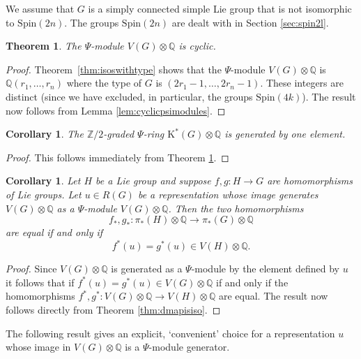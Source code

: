 \documentclass[twoside,a4paper,reqno,11pt]{amsart}
\newtheorem{theorem}[lemma]{Theorem}
\newtheorem{corollary}[lemma]{Corollary}
\newcommand{\K}{\mathrm{K}}
\newcommand{\Q}{\mathbb{Q}}
\newcommand{\Z}{\mathbb{Z}}
\renewcommand{\o}{\otimes}
\newcommand{\Spin}{\mathrm{Spin}}
\begin{document}
We assume that $G$ is a simply connected simple Lie group that is not isomorphic to $\Spin(2n)$. The groups $\Spin(2n)$ are dealt with in Section \ref{sec:spin2l}. 

\begin{theorem} \label{thm:simplesinglegenpsimod}
The $\Psi$-module $V(G)\o\Q$ is cyclic.
\end{theorem}

\begin{proof}
Theorem~\ref{thm:isoswithtype} shows that the $\Psi$-module $V(G) \o \Q$ is $\Q(r_1, \dots, r_n)$ where the type of $G$ is $(2r_1-1, \dots, 2r_n-1)$. These integers are distinct (since we have excluded, in particular, the groups $\Spin(4k)$). The result now follows from Lemma \ref{lem:cyclicpsimodules}. 
\end{proof}


\begin{corollary} \label{cor:Z2psi}
The $\Z/2$-graded $\Psi$-ring $\K^*(G) \o\Q$ is generated by one element.
\end{corollary}

\begin{proof}
This follows immediately from Theorem \ref{thm:simplesinglegenpsimod}.
\end{proof}

\begin{corollary} \label{cor:V(H)}
Let $H$ be a Lie group and suppose $f, g : H \to G$ are homomorphisms of Lie groups.  Let $u \in R(G)$ be a representation whose image generates $V(G)\o \Q$ as a $\Psi$-module $V(G)\o\Q$. Then the two homomorphisms
$$
f_*, g_* : \pi_*(H)\o \Q \to \pi_*(G)\o \Q
$$
are equal if and only if 
$$
f^*(u) = g^*(u) \in V(H) \o \Q.
$$
\end{corollary} 

\begin{proof}
Since $V(G)\o\Q$ is generated as a $\Psi$-module by the element defined by $u$ it follows that if $f^*(u) = g^*(u) \in V(G) \o \Q$ if and only if the homomorphisms $f^*, g^* : V(G)\o \Q \to V(H)\o \Q$ are equal. The result now follows directly from Theorem \ref{thm:dmapisiso}. \end{proof}

The following result gives an explicit, `convenient' choice for a representation $u$ whose image in $V(G) \otimes \Q$ is a $\Psi$-module generator.  
\end{document}

